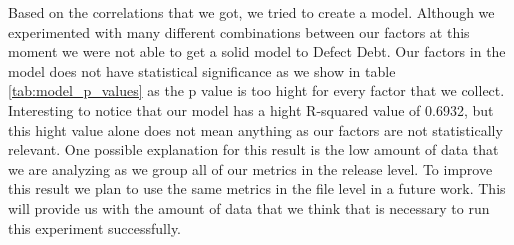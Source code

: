 Based on the correlations that we got, we tried to create a model. Although we experimented with many different combinations between our factors at this moment we were not able to get a solid model to Defect Debt. Our factors in the model does not have statistical significance as we show in table \ref{tab:model_p_values}  as the p value is too hight for every factor that we collect. Interesting to notice that our model has a hight R-squared value of 0.6932, but this hight value alone does not mean anything as our factors are not statistically relevant. One possible explanation for this result is the low amount of data that we are analyzing as we group all of our metrics in the release level. To improve this result we plan to use the same metrics in the file level in a future work. This will provide us with the amount of data that we think that is necessary to run this experiment successfully. 

